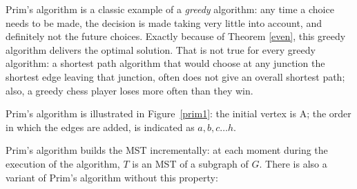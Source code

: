 Prim's algorithm is a classic example of a {\em greedy} algorithm: any
time a choice needs to be made, the decision is made taking very
little into account, and definitely not the future choices. Exactly
because of Theorem \ref{even}, this greedy algorithm delivers the
optimal solution. That is not true for every greedy algorithm: a
shortest path algorithm that would choose at any junction the shortest
edge leaving that junction, often does not give an overall shortest
path; also, a greedy chess player loses more often than they win.

Prim's algorithm is illustrated in Figure~\ref{prim1}: the initial
vertex is A; the order in which the edges are added, is indicated as
$a,b,c \ldots h$.

Prim's algorithm builds the MST incrementally: at each moment during
the execution of the algorithm, $T$ is an MST of a subgraph of
$G$. There is also a variant of Prim's algorithm without this
property:


